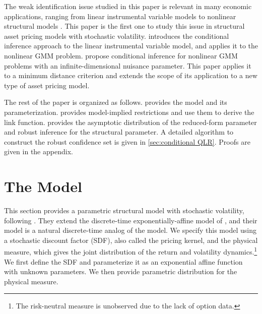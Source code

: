 \documentclass[11pt, letterpaper, twoside]{article}
\begin{document}
The weak identification issue studied in this paper is relevant in many economic applications, ranging from linear instrumental variable models \parencite{staiger1997instrumental} to nonlinear structural models \parencites{mavroeidis2014empirical, andrews2015maximum}. This paper is the first one to study this issue in structural asset pricing models with stochastic volatility. \Textcite{moreira2003conditional} introduces the conditional inference approach to the linear instrumental variable model, and \textcite{kleibergen2005testing} applies it to the nonlinear GMM problem. \Textcite{andrews2016conditional} propose conditional inference for nonlinear GMM problems with an infinite-dimensional nuisance parameter. This paper applies it to a minimum distance criterion and extends the scope of its application to a new type of asset pricing model.

The rest of the paper is organized as follows.  provides the model and its parameterization.  provides model-implied restrictions and use them to derive the link function.  provides the asymptotic distribution of the reduced-form parameter and robust inference for the structural parameter. A detailed algorithm to construct the robust confidence set is given in \cref{sec:conditional QLR}. 
Proofs are given in the appendix.

\section{The Model}\label{sec:model}

This section provides a parametric structural model with stochastic volatility, following \textcite{han2018leverage}. They extend the discrete-time exponentially-affine model of \textcite{darolles2006structural}, and their model is a natural discrete-time analog of the \textcite{heston1993closedform} model. We specify this model using a stochastic discount factor (SDF), also called the pricing kernel, and the physical measure, which gives the joint distribution of the return and volatility dynamics.\footnote{The risk-neutral measure is unobserved due to the lack of option data.} We first define the SDF and parameterize it as an exponential affine function with unknown parameters. We then provide parametric distribution for the physical measure. 
  
\end{document}
